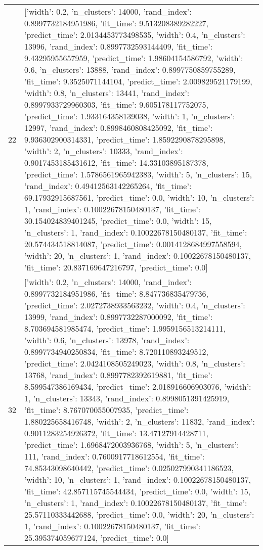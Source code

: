 \begin{tabular}{rl}
22 & [{'width': 0.2, 'n_clusters': 14000, 'rand_index': 0.8997732184951986, 'fit_time': 9.513208389282227, 'predict_time': 2.0134453773498535}, {'width': 0.4, 'n_clusters': 13996, 'rand_index': 0.8997732593144409, 'fit_time': 9.43295955657959, 'predict_time': 1.98604154586792}, {'width': 0.6, 'n_clusters': 13888, 'rand_index': 0.8997750859755289, 'fit_time': 9.3525071144104, 'predict_time': 2.009829521179199}, {'width': 0.8, 'n_clusters': 13441, 'rand_index': 0.8997933729960303, 'fit_time': 9.605178117752075, 'predict_time': 1.933164358139038}, {'width': 1, 'n_clusters': 12997, 'rand_index': 0.8998460808425092, 'fit_time': 9.936302900314331, 'predict_time': 1.8592290878295898}, {'width': 2, 'n_clusters': 10333, 'rand_index': 0.9017453185431612, 'fit_time': 14.33103895187378, 'predict_time': 1.5786561965942383}, {'width': 5, 'n_clusters': 15, 'rand_index': 0.49412563142265264, 'fit_time': 69.17932915687561, 'predict_time': 0.0}, {'width': 10, 'n_clusters': 1, 'rand_index': 0.10022678150480137, 'fit_time': 30.154024839401245, 'predict_time': 0.0}, {'width': 15, 'n_clusters': 1, 'rand_index': 0.10022678150480137, 'fit_time': 20.574434518814087, 'predict_time': 0.0014128684997558594}, {'width': 20, 'n_clusters': 1, 'rand_index': 0.10022678150480137, 'fit_time': 20.837169647216797, 'predict_time': 0.0}] \\
32 & [{'width': 0.2, 'n_clusters': 14000, 'rand_index': 0.8997732184951986, 'fit_time': 8.847736835479736, 'predict_time': 2.0272738933563232}, {'width': 0.4, 'n_clusters': 13999, 'rand_index': 0.8997732287000092, 'fit_time': 8.703694581985474, 'predict_time': 1.9959156513214111}, {'width': 0.6, 'n_clusters': 13978, 'rand_index': 0.8997734940250834, 'fit_time': 8.720110893249512, 'predict_time': 2.0424108505249023}, {'width': 0.8, 'n_clusters': 13768, 'rand_index': 0.8997782392619881, 'fit_time': 8.599547386169434, 'predict_time': 2.018916606903076}, {'width': 1, 'n_clusters': 13343, 'rand_index': 0.8998051391425919, 'fit_time': 8.767070055007935, 'predict_time': 1.880225658416748}, {'width': 2, 'n_clusters': 11832, 'rand_index': 0.9011283254926372, 'fit_time': 13.47127914428711, 'predict_time': 1.6968472003936768}, {'width': 5, 'n_clusters': 111, 'rand_index': 0.7600917718612554, 'fit_time': 74.85343098640442, 'predict_time': 0.025027990341186523}, {'width': 10, 'n_clusters': 1, 'rand_index': 0.10022678150480137, 'fit_time': 42.857115745544434, 'predict_time': 0.0}, {'width': 15, 'n_clusters': 1, 'rand_index': 0.10022678150480137, 'fit_time': 25.57110333442688, 'predict_time': 0.0}, {'width': 20, 'n_clusters': 1, 'rand_index': 0.10022678150480137, 'fit_time': 25.395374059677124, 'predict_time': 0.0}] \\

\end{tabular}
